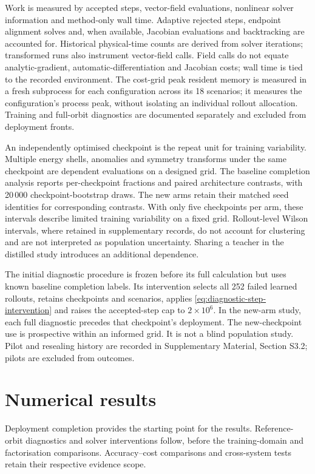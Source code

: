 \documentclass[final,3p,times]{elsarticle}
\begin{document}
Work is measured by accepted steps, vector-field evaluations, nonlinear
solver information and method-only wall time. Adaptive rejected steps,
endpoint alignment solves and, when available, Jacobian evaluations and
backtracking are accounted for. Historical physical-time counts are
derived from solver iterations; transformed runs also instrument vector-field
calls. Field calls do not equate analytic-gradient, automatic-differentiation
and Jacobian costs; wall time is tied to the recorded environment. The cost-grid peak resident memory is measured in
a fresh subprocess for each configuration across its 18 scenarios;
it measures the configuration's process peak, without isolating an
individual rollout allocation.
Training and full-orbit diagnostics are documented separately and excluded
from deployment fronts.

An independently optimised checkpoint is the repeat unit for training
variability. Multiple energy shells, anomalies and symmetry transforms
under the same checkpoint are dependent evaluations on a designed grid.
The baseline completion analysis reports per-checkpoint fractions and
paired architecture contrasts, with 20\,000 checkpoint-bootstrap draws.
The new arms retain their matched seed identities for corresponding
contrasts. With only five checkpoints per arm, these intervals describe
limited training variability on a fixed grid. Rollout-level Wilson
intervals, where retained in supplementary records, do not account for
clustering and are not interpreted as population uncertainty. Sharing a
teacher in the distilled study introduces an additional dependence.

The initial diagnostic procedure is frozen before its full calculation
but uses known baseline completion labels. Its intervention selects all
252 failed learned rollouts, retains checkpoints and scenarios, applies
\eqref{eq:diagnostic-step-intervention} and raises the accepted-step cap
to $2\times10^6$. In the new-arm study, each full diagnostic precedes
that checkpoint's deployment. The new-checkpoint use is prospective within an informed grid.
It is not a blind population study.
Pilot and resealing history are recorded in Supplementary Material,
Section S3.2; pilots are excluded from outcomes.

\section{Numerical results}
\label{sec:results}
Deployment completion provides the starting point for the results.
Reference-orbit diagnostics and solver interventions follow, before
the training-domain and factorisation comparisons. Accuracy--cost
comparisons and cross-system tests retain their respective evidence scope.
\end{document}
